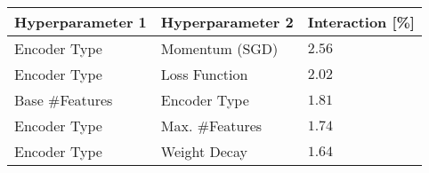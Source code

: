 \begin{tabular}{lll}
\toprule
Hyperparameter 1 & Hyperparameter 2 & Interaction [\%] \\
\midrule
Encoder Type & Momentum (SGD) & $2.56$ \\
Encoder Type & Loss Function & $2.02$ \\
Base #Features & Encoder Type & $1.81$ \\
Encoder Type & Max. #Features & $1.74$ \\
Encoder Type & Weight Decay & $1.64$ \\
\bottomrule
\end{tabular}
